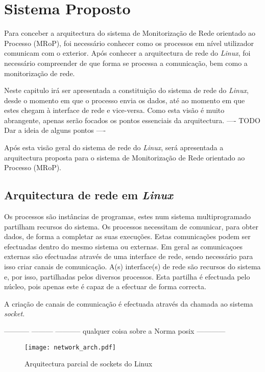 \chapter{Sistema Proposto}
\label{cap:Estrutura}

Para conceber a arquitectura do sistema de Monitorização de Rede orientado ao Processo (MRoP), foi necessário conhecer como os processos em nível utilizador comunicam com o exterior.
Após conhecer a arquitectura de rede do \textit{Linux}, foi necessário compreender de que forma se processa a comunicação, bem como a monitorização de rede.

Neste capitulo irá ser apresentada a constituição do sistema de rede do \textit{Linux}, desde o momento em que o processo envia os dados, até ao momento em que estes chegam à interface de rede e vice-versa.
Como esta visão é muito abrangente, apenas serão focados os pontos essenciais da arquitectura. ---- TODO Dar a ideia de alguns pontos ----

Após esta visão geral do sistema de rede do \textit{Linux}, será apresentada a arquitectura proposta para o sistema de Monitorização de Rede orientado ao Processo (MRoP).



\section{Arquitectura de rede em \textit{Linux}}
\label{sub:network}

Os processos são instâncias de programas, estes num sistema multiprogramado partilham recursos do sistema.
Os processos necessitam de comunicar, para obter dados, de forma a completar as suas execuções.
Estas comunicações podem ser efectuadas dentro do mesmo sistema ou externas.
Em geral as comunicaçoes externas são efectuadas através de uma interface de rede, sendo necessário para isso criar canais de comunicação.
A(s) interface(s) de rede são recursos do sistema e, por isso, partilhadas pelos diversos processos.
Esta partilha é efectuada pelo núcleo, pois apenas este é capaz de a efectuar de forma correcta.

A criação de canais de comunicação é efectuada através da chamada ao sistema \textit{socket}.

----------- --------- ----------- qualquer coisa sobre a Norma posix ------------

\begin{figure}[htbp]
\centering
\texttt{[image: network\_arch.pdf]} 
\caption{Arquitectura parcial de sockets do Linux}
\label{fig:network_arch}
\end{figure}

